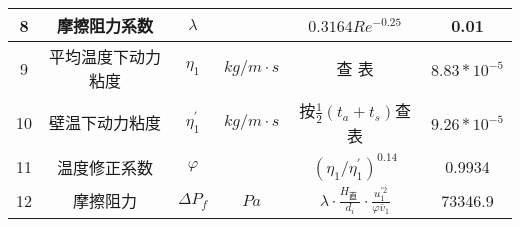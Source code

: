 \begin{table}[H]
{\begin{tabular}{|c|c|c|c|c|c|}
            8    & 摩擦阻力系数       & $ \lambda $        &                                                & $ 0.3164Re^{-0.25} $                                                                               & 0.01              \\ \hline
            9    & 平均温度下动力粘度 & $ \eta_{1} $       & $ kg/m \cdot s $                               & 查 表                                                                                              & $ 8.83*10^{-5} $  \\ \hline
            10   & 壁温下动力粘度     & $ \eta_{1}^{'} $   & $ kg/m \cdot s $                               & 按$ \frac{1}{2}(t_a + t_s) $查表                                                                   & $ 9.26*10^{-5} $  \\ \hline
            11   & 温度修正系数       & $ \varphi $        &                                                & $ \left(\eta_{1} / \eta_{1}^{\prime}\right)^{0.14} $                                               & 0.9934            \\ \hline
            12   & 摩擦阻力           & $ \Delta P_f $     & $ Pa $                                         & $ \lambda \cdot \frac{H_{\text {直 }}}{d_{i}} \cdot \frac{u_{1}^{\prime 2}}{\varphi \bar{v}_{1}} $ & 73346.9           \\ \hline
        \end{tabular}
    }
\end{table}

